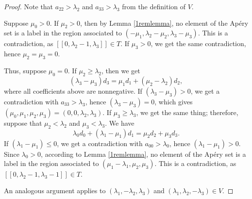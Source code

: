 \documentclass[12pt]{article}
\theoremstyle{remark}
\begin{document}
\begin{proof}
Note that $a_{22} > \lambda_2$ and $a_{33} > \lambda_3$ from the definition of $V$. 

Suppose $\mu_0>0$. If $\mu_2 > 0$, then by Lemma \ref{1remlemma}, no element of the Ap{\'e}ry set is a label in the region associated to $(-\mu_1,\lambda_2-\mu_2,\lambda_3-\mu_3)$. This is a contradiction, as $[[0,\lambda_2-1, \lambda_3]] \in T$. If $\mu_3 > 0$, we get the same contradiction, hence $\mu_2=\mu_3 = 0$.

Thus, suppose $\mu_0 = 0$. If $\mu_2 \geq \lambda_2$, then we get
\begin{equation}\label{lemma_catenary3_eq1}
     (\lambda_3-\mu_3)d_3=\mu_1d_1 + (\mu_2 - \lambda_2)d_2,
\end{equation}
where all coefficients above are nonnegative. If $(\lambda_3-\mu_3) > 0$, we get a contradiction with $a_{33} > \lambda_3$, hence $(\lambda_3-\mu_3) = 0$, which gives $(\mu_0,\mu_1,\mu_2,\mu_3) = (0,0,\lambda_2,\lambda_3)$. If $\mu_3 \geq \lambda_3$, we get the same thing; therefore, suppose that $\mu_2 < \lambda_2$ and $\mu_3 < \lambda_3$. We have
\begin{equation}\label{lemma_catenary3_eq2}
   \lambda_0d_0 + (\lambda_1-\mu_1)d_1 = \mu_2d_2 + \mu_3d_3.
\end{equation}
If $(\lambda_1-\mu_1) \leq 0$, we get a contradiction with $a_{00} > \lambda_0$, hence $(\lambda_1-\mu_1) > 0$. Since $\lambda_0>0$, according to Lemma \ref{1remlemma}, no element of the Ap{\'e}ry set is a label in the region associated to $(\mu_1 - \lambda_1,\mu_2,\mu_3)$. This is a contradiction, as $[[0,\lambda_2-1,\lambda_3-1]] \in T$.

An analogous argument applies to $(\lambda_1,-\lambda_2,\lambda_3)$ and $(\lambda_1,\lambda_2,-\lambda_3) \in V$.
\end{proof}
\end{document}
